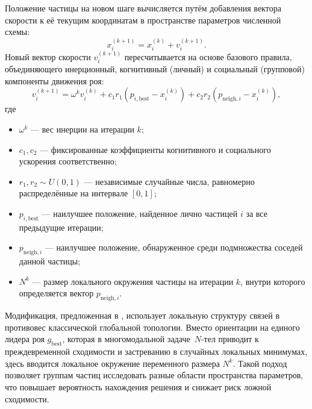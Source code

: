 Положение частицы на новом шаге вычисляется путём добавления вектора скорости к её текущим координатам в пространстве параметров численной схемы:
\begin{equation}
	\label{eq:pso_position}
	x_i^{(k + 1)} = x_i^{(k)} + v_i^{(k + 1)}.
\end{equation}
Новый вектор скорости $v_i^{(k + 1)}$ пересчитывается на основе базового правила, объединяющего инерционный, когнитивный (личный) и социальный (групповой) компоненты движения роя:
\begin{equation}
	\label{eq:pso_velocity}
	v_i^{(k + 1)} = \omega^k v_i^{(k)} + c_1 r_1 \left( p_{i,\text{best}} - x_i^{(k)} \right) + c_2 r_2 \left( p_{\text{neigh},i} - x_i^{(k)} \right),
\end{equation}
где
\begin{itemize}
	\item $\omega^k$ — вес инерции на итерации $k$;
	\item $c_1, c_2$ — фиксированные коэффициенты когнитивного и социального ускорения соответственно;
	\item $r_1, r_2 \sim U(0,1)$ — независимые случайные числа, равномерно распределённые на интервале $[0, 1]$;
	\item $p_{i,\text{best}}$ — наилучшее положение, найденное лично частицей $i$ за все предыдущие итерации;
	\item $p_{\text{neigh},i}$ — наилучшее положение, обнаруженное среди подмножества соседей данной частицы;
	\item $N^k$ — размер локального окружения частицы на итерации $k$, внутри которого определяется вектор $p_{\text{neigh},i}$.
\end{itemize}
Модификация, предложенная в \cite{Anastassi2025}, использует локальную структуру связей в противовес классической глобальной топологии. Вместо ориентации на единого лидера роя $g_{\text{best}}$, которая в многомодальной задаче~$N$-тел приводит к преждевременной сходимости и застреванию в случайных локальных минимумах, здесь вводится локальное окружение переменного размера $N^k$. Такой подход позволяет группам частиц исследовать разные области пространства параметров, что повышает вероятность нахождения решения и снижает риск ложной сходимости.

